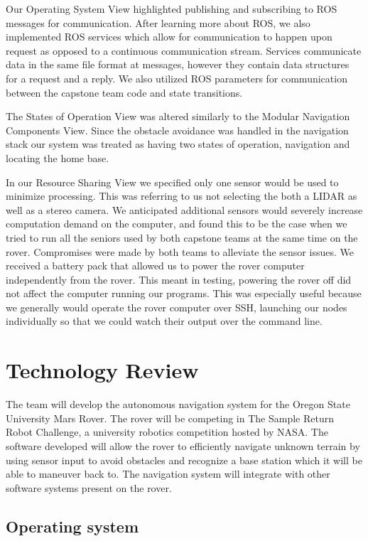 \documentclass[10pt, oneside,onecolumn]{IEEEtran}
\begin{document}
\begin{titlepage}
Our Operating System View highlighted publishing and subscribing to ROS messages for communication. After learning more about ROS, we also implemented ROS services which allow for communication to happen upon request as opposed to a continuous communication stream. Services communicate data in the same file format at messages, however they contain data structures for a request and a reply. We also utilized ROS parameters for communication between the capstone team code and state transitions. 

The States of Operation View was altered similarly to the Modular Navigation Components View. Since the obstacle avoidance was handled in the navigation stack our system was treated as having two states of operation, navigation and locating the home base. 

In our Resource Sharing View we specified only one sensor would be used to minimize processing. This was referring to us not selecting the both a LIDAR as well as a stereo camera. We anticipated additional sensors would severely increase computation demand on the computer, and found this to be the case when we tried to run all the seniors used by both capstone teams at the same time on the rover. Compromises were made by both teams to alleviate the sensor issues. We received a battery pack that allowed us to power the rover computer independently from the rover. This meant in testing, powering the rover off did not affect the computer running our programs. This was especially useful because we generally would operate the rover computer over SSH, launching our nodes individually so that we could watch their output over the command line. 



\section{Technology Review}

	The team will develop the autonomous navigation system for the Oregon State University Mars Rover. The rover will be competing in The Sample Return Robot Challenge, a university robotics competition hosted by NASA. The software developed will allow the rover to efficiently navigate unknown terrain by using sensor input to avoid obstacles and recognize a base station which it will be able to maneuver back to. The navigation system will integrate with other software systems present on the rover. 

\subsection{Operating system}


\end{titlepage}
\end{document}
